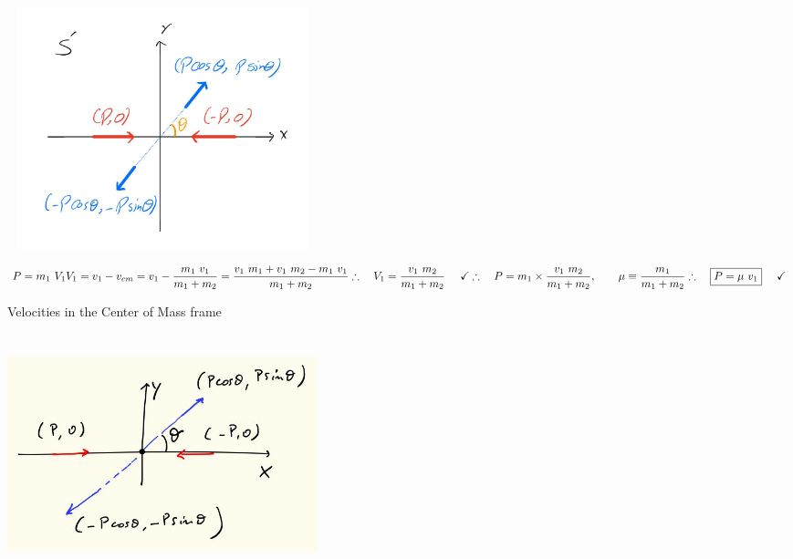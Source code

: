 \documentclass[fleqn]{article}
\begin{document}
\begin{center}
  \includegraphics[height=7cm, width=9cm]{5.JPG}
\end{center}

$
  \\
  P=m_1 ~ V_1
  \\
  \\
  V_1=v_1-v_{cm}=v_1-\dfrac{m_1 ~ v_1}{m_1+m_2}
  =\dfrac{v_1 ~ m_1+v_1 ~ m_2-m_1 ~ v_1}{m_1+m_2}
  \\
  \\
  \\
  \therefore ~~~ V_1=\dfrac{v_1 ~ m_2}{m_1+m_2} ~~~~ \checkmark
  \\
  \\
  \\
  \therefore ~~~ P=m_1 \times \dfrac{v_1 ~ m_2}{m_1+m_2}, ~~~~~~ \mu \equiv \dfrac{m_1}{m_1+m_2}
  \\
  \\
  \\
  \therefore ~~~ \boxed{
    P=\mu ~ v_1
  } ~~~~ \checkmark
$

\pagebreak

Velocities in the Center of Mass frame

\begin{center}
  \includegraphics[height=7cm, width=9cm]{6.JPG}
\end{center}
\end{document}
